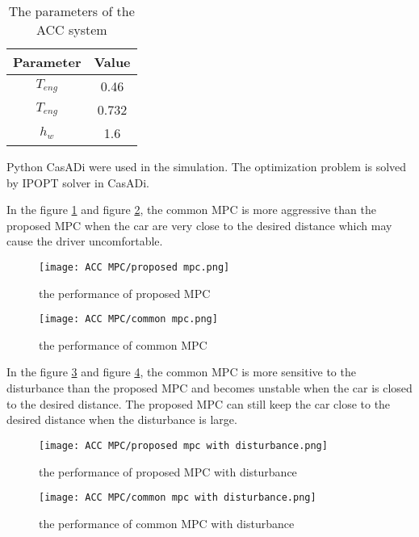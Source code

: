 \documentclass{article}
\numberwithin{equation}{section}
\begin{document}
\begin{table}[h!]
    \centering
    \caption{The parameters of the ACC system}
    \begin{tabular}{|c|c|}
        \hline
        Parameter & Value \\
        \hline
        $T_{eng}$ & 0.46  \\
        \hline
        $T_{eng}$ & 0.732 \\
        \hline
        $h_w$     & 1.6
    \end{tabular}
    \label{tab:parameters}
\end{table}

Python CasADi were used in the simulation. The optimization problem is solved
by IPOPT solver in CasADi.

In the figure \ref{fig:adaptive_mpc} and figure \ref{fig:common_mpc}, the
common MPC is more aggressive than the proposed MPC when the car are very close
to the desired distance which may cause the driver uncomfortable.

\begin{figure}[h!]
    \centering
    \texttt{[image: ACC MPC/proposed mpc.png]}
    \caption{the performance of proposed MPC}
    \label{fig:adaptive_mpc}
\end{figure}

\begin{figure}[h!]
    \centering
    \texttt{[image: ACC MPC/common mpc.png]}
    \caption{the performance of common MPC}
    \label{fig:common_mpc}
\end{figure}

In the figure \ref{fig:proposed_mpc_with_dis} and figure
\ref{fig:common_mpc_with_dis}, the common MPC is more sensitive to the
disturbance than the proposed MPC and becomes unstable when the car is closed
to the desired distance. The proposed MPC can still keep the car close to the
desired distance when the disturbance is large.

\begin{figure}[h!]
    \centering
    \texttt{[image: ACC MPC/proposed mpc with disturbance.png]}
    \caption{the performance of proposed MPC with disturbance}
    \label{fig:proposed_mpc_with_dis}
\end{figure}

\begin{figure}[h!]
    \centering
    \texttt{[image: ACC MPC/common mpc with disturbance.png]}
    \caption{the performance of common MPC with disturbance}
    \label{fig:common_mpc_with_dis}
\end{figure}
\end{document}
